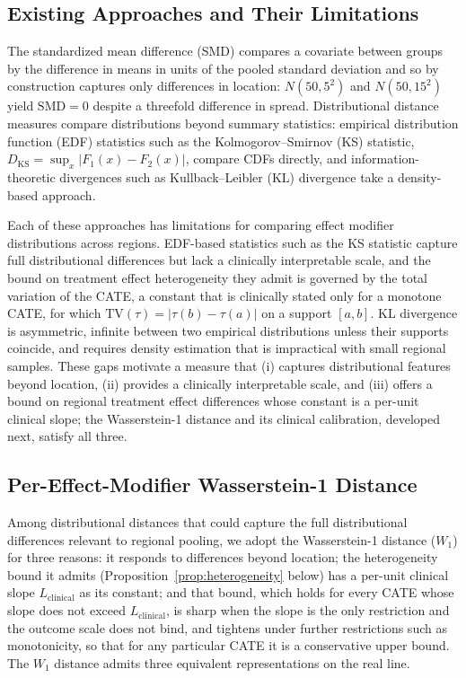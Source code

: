 \documentclass[AMA,Times1COL]{WileyNJDv5}
\begin{document}
\subsection{Existing Approaches and Their Limitations}\label{sec:existing}

The standardized mean difference (SMD) compares a covariate between groups by the difference in means in units of the pooled standard deviation\cite{austin2011} and so by construction captures only differences in location: $N(50, 5^2)$ and $N(50, 15^2)$ yield $\text{SMD} = 0$ despite a threefold difference in spread. Distributional distance measures compare distributions beyond summary statistics: empirical distribution function (EDF) statistics such as the Kolmogorov--Smirnov (KS) statistic, $D_{\text{KS}} = \sup_x |F_1(x) - F_2(x)|$, compare CDFs directly, and information-theoretic divergences such as Kullback--Leibler (KL) divergence take a density-based approach.

Each of these approaches has limitations for comparing effect modifier distributions across regions. EDF-based statistics such as the KS statistic capture full distributional differences but lack a clinically interpretable scale, and the bound on treatment effect heterogeneity they admit is governed by the total variation of the CATE, a constant that is clinically stated only for a monotone CATE, for which $\mathrm{TV}(\tau) = |\tau(b) - \tau(a)|$ on a support $[a, b]$. KL divergence is asymmetric, infinite between two empirical distributions unless their supports coincide, and requires density estimation that is impractical with small regional samples. These gaps motivate a measure that (i) captures distributional features beyond location, (ii) provides a clinically interpretable scale, and (iii) offers a bound on regional treatment effect differences whose constant is a per-unit clinical slope; the Wasserstein-1 distance and its clinical calibration, developed next, satisfy all three.

\subsection{Per-Effect-Modifier Wasserstein-1 Distance}\label{sec:nabcd_metric}

Among distributional distances that could capture the full distributional differences relevant to regional pooling, we adopt the Wasserstein-1 distance ($W_1$) for three reasons: it responds to differences beyond location; the heterogeneity bound it admits (Proposition~\ref{prop:heterogeneity} below) has a per-unit clinical slope $L_{\text{clinical}}$ as its constant; and that bound, which holds for every CATE whose slope does not exceed $L_{\text{clinical}}$, is sharp when the slope is the only restriction and the outcome scale does not bind, and tightens under further restrictions such as monotonicity, so that for any particular CATE it is a conservative upper bound. The $W_1$ distance admits three equivalent representations on the real line.\cite{panaretos2019}
\end{document}
